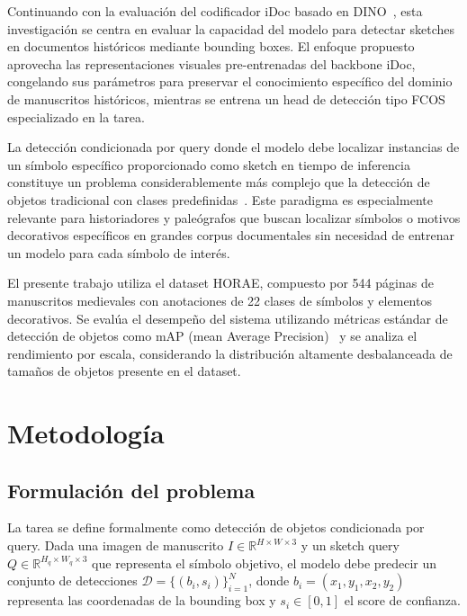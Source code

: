 \documentclass[11pt]{article}
\begin{document}
Continuando con la evaluación del codificador iDoc basado en DINO~\cite{caron2021emerging}, esta investigación se centra en evaluar la capacidad del modelo para detectar sketches en documentos históricos mediante bounding boxes. El enfoque propuesto aprovecha las representaciones visuales pre-entrenadas del backbone iDoc, congelando sus parámetros para preservar el conocimiento específico del dominio de manuscritos históricos, mientras se entrena un head de detección tipo FCOS~\cite{tian2019fcos} especializado en la tarea.

La detección condicionada por query donde el modelo debe localizar instancias de un símbolo específico proporcionado como sketch en tiempo de inferencia constituye un problema considerablemente más complejo que la detección de objetos tradicional con clases predefinidas~\cite{he2017mask}. Este paradigma es especialmente relevante para historiadores y paleógrafos que buscan localizar símbolos o motivos decorativos específicos en grandes corpus documentales sin necesidad de entrenar un modelo para cada símbolo de interés.

El presente trabajo utiliza el dataset HORAE, compuesto por 544 páginas de manuscritos medievales con anotaciones de 22 clases de símbolos y elementos decorativos. Se evalúa el desempeño del sistema utilizando métricas estándar de detección de objetos como mAP (mean Average Precision)~\cite{everingham2010pascal} y se analiza el rendimiento por escala, considerando la distribución altamente desbalanceada de tamaños de objetos presente en el dataset.


\section{Metodología}

\subsection{Formulación del problema}

La tarea se define formalmente como detección de objetos condicionada por query. Dada una imagen de manuscrito $I \in \mathbb{R}^{H \times W \times 3}$ y un sketch query $Q \in \mathbb{R}^{H_q \times W_q \times 3}$ que representa el símbolo objetivo, el modelo debe predecir un conjunto de detecciones $\mathcal{D} = \{(b_i, s_i)\}_{i=1}^{N}$, donde $b_i = (x_1, y_1, x_2, y_2)$ representa las coordenadas de la bounding box y $s_i \in [0,1]$ el score de confianza.
\end{document}
